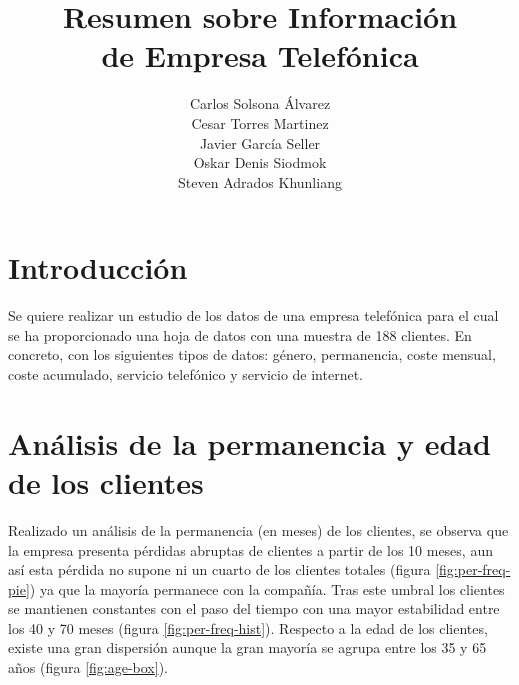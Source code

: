 \documentclass[10pt,a4paper, titlepage]{article}
\title{\textbf{Resumen sobre Información\\de Empresa Telefónica}}
\author{Carlos Solsona Álvarez\\Cesar Torres Martinez\\Javier García Seller\\Oskar Denis Siodmok\\Steven Adrados Khunliang}
\begin{document}
\maketitle
\pagebreak
\section{Introducción}
Se quiere realizar un estudio de los datos de una empresa telefónica para el cual se ha proporcionado una hoja de datos con una muestra de 188 clientes.
En concreto, con los siguientes tipos de datos: género, permanencia, coste mensual, coste acumulado, servicio telefónico y servicio de internet.

\section{Análisis de la permanencia y edad de los clientes}
Realizado un análisis de la permanencia (en meses) de los clientes, se observa que la empresa presenta pérdidas abruptas de clientes a partir de los 10 meses, aun así esta pérdida no supone ni un cuarto de los clientes totales (figura \ref{fig:per-freq-pie}) ya que la mayoría permanece con la compañía. Tras este umbral los clientes se mantienen constantes con el paso del tiempo con una mayor estabilidad entre los 40 y 70 meses (figura \ref{fig:per-freq-hist}). Respecto a la edad de los clientes, existe una gran dispersión aunque la gran mayoría se agrupa entre los 35 y 65 años (figura \ref{fig:age-box}).
\end{document}
